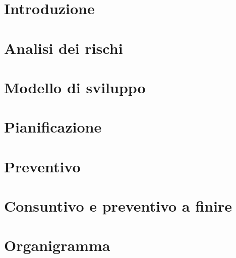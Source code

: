 \documentclass[11pt,a4paper]{article}
\begin{document}
	\section{Introduzione}
			
		\newpage	
	
	\section{Analisi dei rischi}
		
		\newpage	

	\section{Modello di sviluppo}
		
		\newpage	

	\section{Pianificazione}
		
		\newpage
				
	\section{Preventivo}
		
		\newpage
				
	\section{Consuntivo e preventivo a finire}
		
		\newpage
		
	\appendix
	\section{Organigramma}
%		
\end{document}
